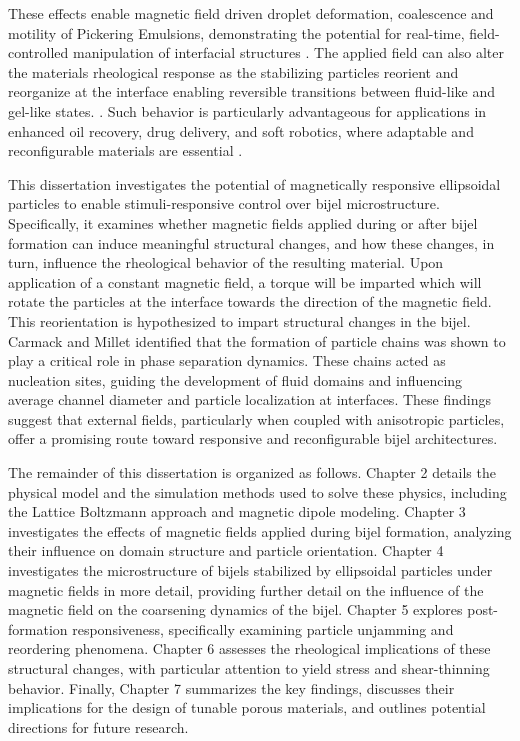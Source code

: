 These effects enable magnetic field driven droplet deformation, coalescence and 
motility of Pickering Emulsions, demonstrating the potential for real-time, field-controlled manipulation of interfacial structures \cite{melle_pickering_2005, tham_magnetophoresis_2021}.
The applied field can also alter the materials rheological response as the stabilizing particles reorient and reorganize at the interface
enabling reversible transitions between fluid-like and gel-like states. \cite{qiao_magnetorheological_2012, melle_pickering_2005}. 
Such behavior is particularly advantageous for applications in enhanced oil recovery, drug delivery, and soft robotics, where adaptable and 
reconfigurable materials are essential \cite{tham_magnetophoresis_2021}.


This dissertation investigates the potential of magnetically responsive ellipsoidal particles to enable stimuli-responsive control over bijel microstructure. Specifically, it examines whether magnetic 
fields applied during or after bijel formation can induce meaningful structural changes, and how these changes, in turn, influence the rheological behavior of the resulting material. Upon application of
a constant magnetic field, a torque will be imparted which will rotate the particles at the interface towards the direction of the magnetic field. This reorientation is hypothesized to impart
structural changes in the bijel. Carmack and Millet identified that the formation of particle chains was shown to play a critical role in phase separation dynamics. These chains acted as 
nucleation sites, guiding the development of fluid domains and influencing average channel diameter and particle localization at interfaces. These findings suggest that external fields, 
particularly when coupled with anisotropic particles, offer a promising route toward responsive and reconfigurable bijel architectures.

The remainder of this dissertation is organized as follows. Chapter 2 details the physical model and the simulation methods used to solve these physics, including the Lattice Boltzmann approach 
and magnetic dipole modeling. Chapter 3 investigates the effects of magnetic fields applied during bijel formation, analyzing their influence on domain structure and particle orientation. 
Chapter 4 investigates the microstructure of bijels stabilized by ellipsoidal particles under magnetic fields in more detail, providing further detail on the influence of the magnetic field on
the coarsening dynamics of the bijel.
Chapter 5 explores 
post-formation responsiveness, specifically examining particle unjamming and reordering phenomena. Chapter 6 assesses the rheological implications of these structural changes, with particular attention to 
yield stress and shear-thinning behavior. Finally, Chapter 7 summarizes the key findings, discusses their implications for the design of tunable porous materials, and outlines potential directions for future 
research.

